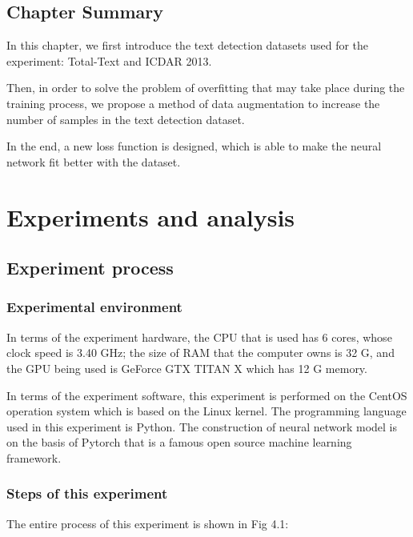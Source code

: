 \documentclass[22pt, UTF8]{article}
\numberwithin{figure}{section}
\numberwithin{table}{section}
\numberwithin{equation}{section} %
\begin{document}
\subsection{Chapter Summary}

\setlength\parindent{2em} In this chapter, we first introduce the text detection datasets used for the experiment: Total-Text and ICDAR 2013.

\setlength\parindent{2em} Then, in order to solve the problem of overfitting that may take place during the training process, we propose a method of data augmentation to increase the number of samples in the text detection dataset.

\setlength\parindent{2em} In the end, a new loss function is designed, which is able to make the neural network fit better with the dataset.

\newpage

\section{Experiments and analysis}

\subsection{Experiment process}

\subsubsection{Experimental environment}

\setlength\parindent{2em} In terms of the experiment hardware, the CPU that is used has 6 cores, whose clock speed is 3.40 GHz; the size of RAM that the computer owns is 32 G, and the GPU being used is GeForce GTX TITAN X which has 12 G memory.

\setlength\parindent{2em} In terms of the experiment software, this experiment is performed on the CentOS operation system which is based on the Linux kernel. The programming language used in this experiment is Python. The construction of neural network model is on the basis of Pytorch that is a famous open source machine learning framework.

\subsubsection{Steps of this experiment}

\setlength\parindent{2em} The entire process of this experiment is shown in Fig 4.1:
\end{document}
